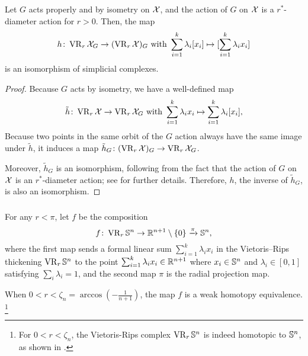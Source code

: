 \medskip\lemma
Let $G$ acts properly and by isometry on $\mathcal{X}$, and the action of $G$ on $\mathcal{X}$ is a $r^*$-diameter action for $r>0$. Then, the map
\[
h \colon \operatorname{VR}_r\mathcal{X}_G \to (\operatorname{VR}_r\mathcal{X})_G
\text{ with }
\sum_{i=1}^k \lambda_i [x_i] \mapsto [\sum_{i=1}^k \lambda_i x_i]
\]
is an isomorphism of simplicial complexes.

\begin{proof}
	Because $G$ acts by isometry, we have a well-defined map
	\[
	\tilde{h} \colon \operatorname{VR}_r\mathcal{X} \to \operatorname{VR}_r\mathcal{X}_G
	\text{ with }
	\sum_{i=1}^k \lambda_i x_i \mapsto \sum_{i=1}^k \lambda_i [x_i],
	\]
	Because two points in the same orbit of the $G$ action always have the same image under $\tilde{h}$, it induces a map $\tilde{h}_G \colon (\operatorname{VR}_r\mathcal{X})_G \to \operatorname{VR}_r\mathcal{X}_G$.

	Moreover, $\tilde{h}_G$ is an isomorphism, following from the fact that the action of $G$ on $\mathcal{X}$ is an $r^*$-diameter action; see \cite[Proposition 3.5]{adams2022metric} for further details.
	Therefore, $h$, the inverse of $\tilde{h}_G$, is also an isomorphism.
\end{proof}

\subsubsection{}
\label{subsub:f}

For any $r<\pi$, let $f$ be the composition
\[
f \colon \operatorname{VR}_r\mathbb{S}^n \to \mathbb{R}^{n+1} \setminus \{0\} \xrightarrow{\pi} \mathbb{S}^n,
\]
where the first map sends a formal linear sum $\sum_{i=1}^k \lambda_i x_i$ in the Vietoris--Rips thickening $\operatorname{VR}_r\mathbb{S}^n$ to the point $\sum_{i=1}^k \lambda_i x_i \in \mathbb{R}^{n+1}$ where $x_i \in \mathbb{S}^n$ and $\lambda_i \in [0,1]$ satisfying $\sum_i\lambda_i=1$, and the second map $\pi$ is the radial projection map.

\medskip\lemma
When $0<r<\zeta_n=\arccos{(-\tfrac{1}{n+1})}$, the map $f$ is a weak homotopy equivalence.
\footnote{For $0<r<\zeta_n$, the Vietoris-Rips complex $\operatorname{VR}_r\mathbb{S}^n$ is indeed homotopic to $\mathbb{S}^n$, as shown in \cite[Theorem 7.1]{lim2020vietoris}.}

